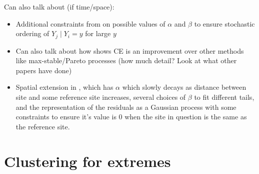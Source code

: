 \documentclass{article}
\numberwithin{equation}{section}
\begin{document}
Can also talk about (if time/space):
\begin{itemize}
  \item Additional constraints from \cite{Keef2013} on possible values of $\alpha$ and $\beta$ to ensure stochastic ordering of $Y_j \mid Y_i = y$ for large $y$ 
  \item Can also talk about how \cite{Tawn2018} shows CE is an improvement over other methods like max-stable/Pareto processes (how much detail? Look at what other papers have done)
  \item Spatial extension in \cite{Wadsworth2018}, which has $\alpha$ which slowly decays as distance between site and some reference site increases, several choices of $\beta$ to fit different tails, and the representation of the residuals as a Gaussian process with some constraints to ensure it's value is 0 when the site in question is the same as the reference site. 
\end{itemize}

\section{Clustering for extremes}\label{sec:clustering}
\end{document}
